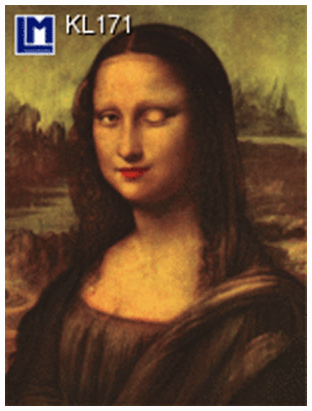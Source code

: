 \documentclass{beamer}
\begin{document}
\begin{frame}
  \includegraphics[height=\textheight]{monada.jpg}  
\end{frame}
\end{document}
